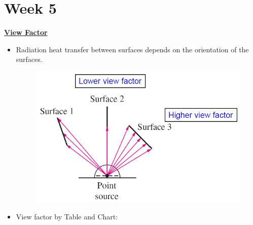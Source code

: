 \section{Week 5}
\large \textbf{\underline{View Factor}}

\begin{itemize}
    \item Radiation heat transfer between surfaces depends on the \color{blue} orientation of the surfaces. \color{black}
    \begin{figure}[H]
        \centering
        \includegraphics[width=1.0\linewidth]{images/view_factor_1.png}
    \end{figure}
    \item View factor by Table and Chart:
    \begin{figure}[H]

\end{figure}
\end{itemize}
